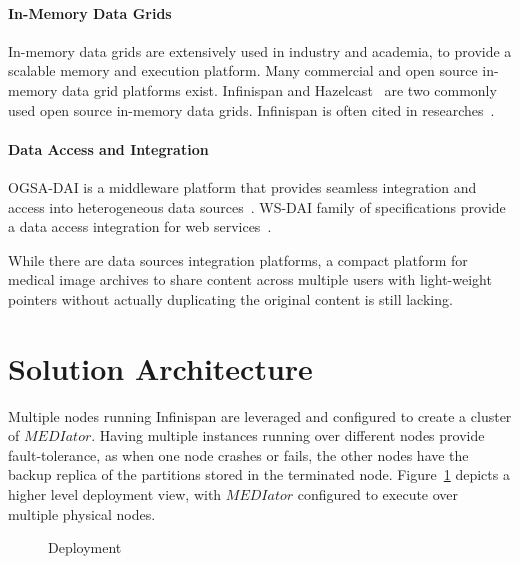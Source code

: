 \documentclass[conference]{IEEEtran}
\begin{document}
\paragraph*{\textbf{In-Memory Data Grids}}
In-memory data grids are extensively used in industry and academia, to provide a scalable memory and execution platform. Many commercial and open source in-memory data grid platforms exist. Infinispan and Hazelcast~\cite{hazelcast} are two commonly used open source in-memory data grids. Infinispan is often cited in researches~\cite{palmieri2012integrated,rosa2011goal,ruivo2011exploiting}.

\paragraph*{\textbf{Data Access and Integration}}
OGSA-DAI is a middleware platform that provides seamless integration and access into heterogeneous data sources~\cite{antonioletti2005design}. WS-DAI family of specifications provide a data access integration for web services~\cite{antonioletti2006ws}.

While there are data sources integration platforms, a compact platform for medical image archives to share content across multiple users with light-weight pointers without actually duplicating the original content is still lacking.


\section{Solution Architecture}

Multiple nodes running Infinispan are leveraged and configured to create a cluster of $MEDIator$. Having multiple instances running over different nodes provide fault-tolerance, as when one node crashes or fails, the other nodes have the backup replica of the partitions stored in the terminated node. Figure~\ref{fig:deployment} depicts a higher level deployment view, with $MEDIator$ configured to execute over multiple physical nodes.
\begin{figure}[!h]
\begin{center}
\end{center}
 \caption{Deployment}
 \label{fig:deployment}
\end{figure}
\end{document}
